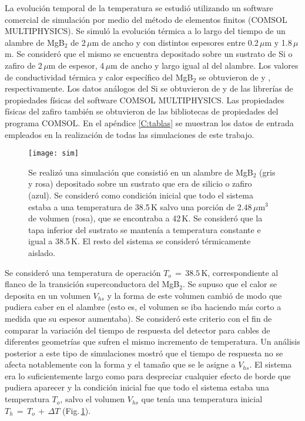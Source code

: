 La evolución temporal de la temperatura se estudió utilizando un software comercial de simulación por medio del método de elementos finitos (COMSOL MULTIPHYSICS). Se simuló la evolución térmica a lo largo del tiempo de un alambre de MgB$_2$ de 2\,$\mu$m de ancho y con distintos espesores entre 0.2\,$\mu$m y 1.8\,$\mu$m. Se consideró que el mismo se encuentra depositado sobre un sustrato de Si o zafiro de 2\,$\mu$m de espesor, 4\,$\mu$m de ancho y largo igual al del alambre. Los valores de conductividad térmica y calor específico del MgB$_2$ se obtuvieron de \cite{Putti2003} y \cite{Bauer2001}, respectivamente. Los datos análogos del Si se obtuvieron de \cite{Flubacher1959} y de las librerías de propiedades físicas del software COMSOL MULTIPHYSICS. Las propiedades físicas del zafiro también se obtuvieron de las bibliotecas de propiedades del programa COMSOL. En el apéndice \ref{C:tablas} se muestran los datos de entrada empleados en la realización de todas las simulaciones de este trabajo.
\begin{figure}[tbh!]
 \begin{center}
    \texttt{[image: sim]}
  \end{center}
  \caption[Condiciones de borde utilizadas para simular el comportamiento térmico de un cable de MgB$_2$.]{Se realizó una simulación que consistió en un alambre de MgB$_2$ (gris y rosa) depositado sobre un sustrato que era de silicio o zafiro (azul). Se consideró como condición inicial que todo el sistema estaba a una temperatura de 38.5\,K salvo una porción de 2.48\,$\mu$m$^3$ de volumen (rosa), que se encontraba a 42\,K. Se consideró que la tapa inferior del sustrato se mantenía a temperatura constante e igual a 38.5\,K. El resto del sistema se consideró térmicamente aislado.}
\label{fig:bordes}
\end{figure}

Se consideró una temperatura de operación $T_o \, = \, 38.5$\,K, correspondiente al flanco de la transición superconductora del MgB$_2$\cite{Nagamatsu2001}. Se supuso que el calor se deposita en un volumen $V_{hs}$ y la forma de este volumen cambió de modo que pudiera caber en el alambre (esto es, el volumen se iba haciendo más corto a medida que su espesor aumentaba). Se consideró este criterio con el fin de comparar la variación del tiempo de respuesta del detector para cables de diferentes geometrías que sufren el mismo incremento de temperatura. Un análisis posterior a este tipo de simulaciones mostró que el tiempo de respuesta no se afecta notablemente con la forma y el tamaño que se le asigne a $V_{hs}$. El sistema era lo suficientemente largo como para despreciar cualquier efecto de borde que pudiera aparecer y la condición inicial fue que todo el sistema estaba una temperatura $T_o$, salvo el volumen $V_{hs}$ que tenía una temperatura inicial $T_h \, = \, T_o\, + \, \Delta T$ (Fig.\,\ref{fig:bordes}).


